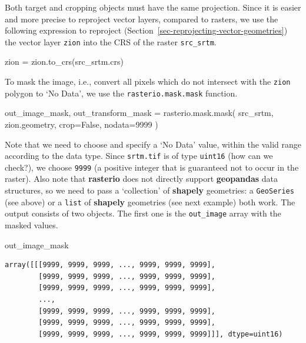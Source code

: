 \documentclass[
  letterpaper,
]{krantz}
\newenvironment{Shaded}{\begin{snugshade}}{\end{snugshade}}
\newcommand{\DecValTok}[1]{\textcolor[rgb]{0.68,0.00,0.00}{#1}}
\newcommand{\NormalTok}[1]{\textcolor[rgb]{0.00,0.23,0.31}{#1}}
\newcommand{\OperatorTok}[1]{\textcolor[rgb]{0.37,0.37,0.37}{#1}}
\newcommand{\VariableTok}[1]{\textcolor[rgb]{0.07,0.07,0.07}{#1}}
\begin{document}
Both target and cropping objects must have the same projection. Since it
is easier and more precise to reproject vector layers, compared to
rasters, we use the following expression to reproject
(Section~\ref{sec-reprojecting-vector-geometries}) the vector layer
\texttt{zion} into the CRS of the raster \texttt{src\_srtm}.

\begin{Shaded}
\begin{Highlighting}[]
\NormalTok{zion }\OperatorTok{=}\NormalTok{ zion.to\_crs(src\_srtm.crs)}
\end{Highlighting}
\end{Shaded}

To mask the image, i.e., convert all pixels which do not intersect with
the \texttt{zion} polygon to `No Data', we use the
\texttt{rasterio.mask.mask} function.

\begin{Shaded}
\begin{Highlighting}[]
\NormalTok{out\_image\_mask, out\_transform\_mask }\OperatorTok{=}\NormalTok{ rasterio.mask.mask(}
\NormalTok{    src\_srtm, }
\NormalTok{    zion.geometry, }
\NormalTok{    crop}\OperatorTok{=}\VariableTok{False}\NormalTok{, }
\NormalTok{    nodata}\OperatorTok{=}\DecValTok{9999}
\NormalTok{)}
\end{Highlighting}
\end{Shaded}

Note that we need to choose and specify a `No Data' value, within the
valid range according to the data type. Since \texttt{srtm.tif} is of
type \texttt{uint16} (how can we check?), we choose \texttt{9999} (a
positive integer that is guaranteed not to occur in the raster). Also
note that \textbf{rasterio} does not directly support \textbf{geopandas}
data structures, so we need to pass a `collection' of \textbf{shapely}
geometries: a \texttt{GeoSeries} (see above) or a \texttt{list} of
\textbf{shapely} geometries (see next example) both work. The output
consists of two objects. The first one is the \texttt{out\_image} array
with the masked values.

\begin{Shaded}
\begin{Highlighting}[]
\NormalTok{out\_image\_mask}
\end{Highlighting}
\end{Shaded}

\begin{verbatim}
array([[[9999, 9999, 9999, ..., 9999, 9999, 9999],
        [9999, 9999, 9999, ..., 9999, 9999, 9999],
        [9999, 9999, 9999, ..., 9999, 9999, 9999],
        ...,
        [9999, 9999, 9999, ..., 9999, 9999, 9999],
        [9999, 9999, 9999, ..., 9999, 9999, 9999],
        [9999, 9999, 9999, ..., 9999, 9999, 9999]]], dtype=uint16)
\end{verbatim}
\end{document}
